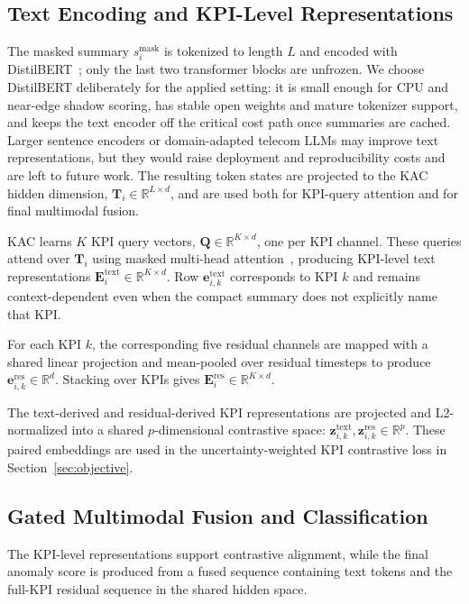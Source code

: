 \documentclass[conference]{IEEEtran}
\begin{document}
\subsection{Text Encoding and KPI-Level Representations}
\label{sec:text_encoding}

The masked summary $s_i^{\mathrm{mask}}$ is tokenized to length $L$ and encoded with DistilBERT~\cite{sanh2019distilbert}; only the last two transformer blocks are unfrozen. We choose DistilBERT deliberately for the applied setting: it is small enough for CPU and near-edge shadow scoring, has stable open weights and mature tokenizer support, and keeps the text encoder off the critical cost path once summaries are cached. Larger sentence encoders or domain-adapted telecom LLMs may improve text representations, but they would raise deployment and reproducibility costs and are left to future work. The resulting token states are projected to the KAC hidden dimension,
$\mathbf{T}_i \in \mathbb{R}^{L \times d}$, and are used both for KPI-query attention and for final multimodal fusion.

KAC learns $K$ KPI query vectors, $\mathbf{Q}\in\mathbb{R}^{K \times d}$, one per KPI channel. These queries attend over $\mathbf{T}_i$ using masked multi-head attention~\cite{vaswani2017attention}, producing KPI-level text representations
$\mathbf{E}^{\mathrm{text}}_i \in \mathbb{R}^{K \times d}$.
Row $\mathbf{e}^{\mathrm{text}}_{i,k}$ corresponds to KPI $k$ and remains context-dependent even when the compact summary does not explicitly name that KPI.

For each KPI $k$, the corresponding five residual channels are mapped with a shared linear projection and mean-pooled over residual timesteps to produce $\mathbf{e}^{\mathrm{res}}_{i,k}\in\mathbb{R}^{d}$. Stacking over KPIs gives $\mathbf{E}^{\mathrm{res}}_i\in\mathbb{R}^{K \times d}$.

The text-derived and residual-derived KPI representations are projected and L2-normalized into a shared $p$-dimensional contrastive space:
$\mathbf{z}^{\mathrm{text}}_{i,k}, \mathbf{z}^{\mathrm{res}}_{i,k}\in\mathbb{R}^{p}$.
These paired embeddings are used in the uncertainty-weighted KPI contrastive loss in Section~\ref{sec:objective}.
\subsection{Gated Multimodal Fusion and Classification}
\label{sec:fusion}

The KPI-level representations support contrastive alignment, while the final anomaly score is produced from a fused sequence containing text tokens and the full-KPI residual sequence in the shared hidden space.
\end{document}
